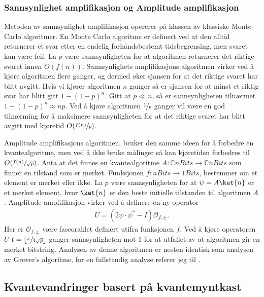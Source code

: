     \subsubsection*{Sannsynlighet amplifikasjon og Amplitude amplifikasjon}

        Metoden av sannsynlighet amplifikasjon opererer på klassen av klassiske Monte Carlo algoritmer. En Monte Carlo algoritme er definert ved at den alltid returnerer et svar etter en endelig forhåndsbestemt tidsbegrensing, men svaret kan være feil. La $p$ være sannsynligheten for at algoritmen returnerer det riktige svaret innen $O(f(n))$. Sannsynlighets amplifikasjons algoritmen virker ved å kjøre algoritmen flere ganger, og dermed øker sjansen for at det riktige svaret har blitt avgitt. Hvis vi kjører algoritmen $n$ ganger så er sjansen for at minst et riktig svar har blitt gitt $1-(1-p)^n$. Gitt at $p\ll n$, så er sannsynligheten tilnærmet $1-(1-p)^n\approx np$. Ved å kjøre algoritmen $\sfrac{1}{p}$ ganger vil være en god tilnærming for å maksimere sannsynligheten for at det riktige svaret har blitt avgitt med kjøretid $O(\sfrac{f(n)}{p})$.
        
        Amplitude amplifikasjons algoritmen, bruker den samme ideen for å forbedre en kvantealgoritme, men ved å ikke bruke målinger så kan kjøretiden forbedres til $O(\sfrac{f(n)}{\sqrt{p}})$. Anta at det finnes en kvantealgoritme $A:\mathbb{C}nBits\rightarrow\mathbb{C}nBits$ som finner en tilstand som er merket. Funksjonen $f:nBits\rightarrow 1Bits$, bestemmer om et element er merket eller ikke. La $p$ være sannsynligheten for at $\psi = A\ket{n}$ er et merket element, hvor $\ket{n}$ er den beste initielle tilstanden til algoritmen $A$. Amplitude amplifikasjon virker ved å definere en ny operator
        \begin{align*}
            U = (2\psi\cdot\psi^*-I)\mathcal{O}_{f,\pm}.
        \end{align*}
        Her er $\mathcal{O}_{f,\pm}$ være faseoraklet definert utifra funksjonen $f$. Ved å kjøre operatoren $U$ $t=\lfloor\sfrac{\pi}{4\sqrt{p}}\rfloor$ ganger sannsynligheten mot $1$ for at utfallet av at algoritmen gir en merket bitstring. Analysen av denne algoritmen er nesten identisk som analysen av Grover's algoritme, for en fullstendig analyse referer jeg til \cite{portugal_2019}.

\subsection{Kvantevandringer basert på kvantemyntkast}

